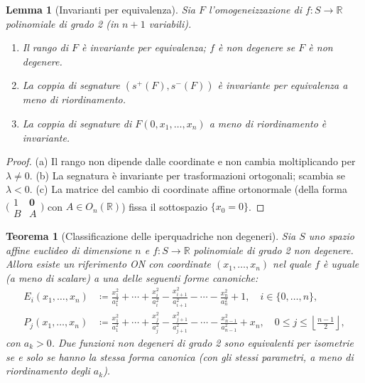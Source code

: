 \documentclass[11pt, a4paper]{book}
\theoremstyle{definition}
\theoremstyle{plain}
\newtheorem{teorema}[definizione]{Teorema}
\newtheorem{lemma}[definizione]{Lemma}
\theoremstyle{remark}
\newcommand{\R}{\mathbb{R}}
\begin{document}
\begin{lemma}[Invarianti per equivalenza]
\label{lem:inv-eq}
Sia $F$ l'omogeneizzazione di $f \colon S \to \R$ polinomiale di grado 2 (in $n+1$ variabili).
\begin{enumerate}[label=(\alph*)]
  \item Il rango di $F$ è invariante per equivalenza; $f$ è \emph{non degenere} se $F$ è non degenere.
  \item La coppia di segnature $(s^+(F), s^-(F))$ è invariante per equivalenza a meno di riordinamento.
  \item La coppia di segnature di $F(0, x_1, \ldots, x_n)$ a meno di riordinamento è invariante.
\end{enumerate}
\end{lemma}

\begin{proof}
(a) Il rango non dipende dalle coordinate e non cambia moltiplicando per $\lambda \neq 0$. (b) La segnatura è invariante per trasformazioni ortogonali; scambia se $\lambda < 0$. (c) La matrice del cambio di coordinate affine ortonormale (della forma $\bigl(\begin{smallmatrix}1&\mathbf{0}\\B&A\end{smallmatrix}\bigr)$ con $A\in O_n(\R)$) fissa il sottospazio $\{x_0=0\}$.
\end{proof}

\begin{teorema}[Classificazione delle iperquadriche non degeneri]
\label{thm:classeq}
Sia $S$ uno spazio affine euclideo di dimensione $n$ e $f \colon S \to \R$ polinomiale di grado 2 non degenere. Allora esiste un riferimento ON con coordinate $(x_1, \ldots, x_n)$ nel quale $f$ è uguale (a meno di scalare) a una delle seguenti forme canoniche:
\begin{align}
  E_i(x_1,\ldots,x_n) &\coloneqq \frac{x_1^2}{a_1^2} + \cdots + \frac{x_i^2}{a_i^2} - \frac{x_{i+1}^2}{a_{i+1}^2} - \cdots - \frac{x_n^2}{a_n^2} + 1, \quad i \in \{0,\ldots,n\}, \label{eq:Ei} \\
  P_j(x_1,\ldots,x_n) &\coloneqq \frac{x_1^2}{a_1^2} + \cdots + \frac{x_j^2}{a_j^2} - \frac{x_{j+1}^2}{a_{j+1}^2} - \cdots - \frac{x_{n-1}^2}{a_{n-1}^2} + x_n, \quad 0 \leq j \leq \left\lfloor\frac{n-1}{2}\right\rfloor, \label{eq:Pj}
\end{align}
con $a_k > 0$. Due funzioni non degeneri di grado 2 sono equivalenti per isometrie se e solo se hanno la stessa forma canonica (con gli stessi parametri, a meno di riordinamento degli $a_k$).
\end{teorema}
\end{document}
